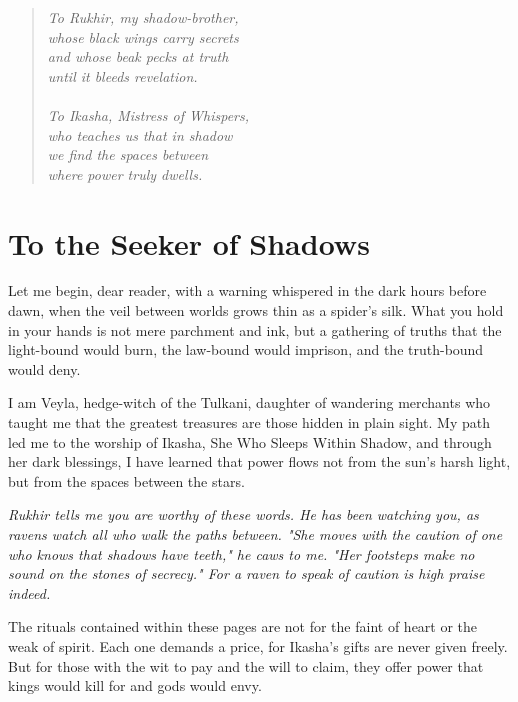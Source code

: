 \documentclass[12pt,twoside]{book}
\newcommand{\shadow}[1]{\textit{#1}}
\begin{document}
\newpage
\thispagestyle{empty}
\vspace*{8cm}
\begin{center}
\begin{verse}
\textit{To Rukhir, my shadow-brother,}\\
\textit{whose black wings carry secrets} \\
\textit{and whose beak pecks at truth} \\
\textit{until it bleeds revelation.} \\
\ \\
\textit{To Ikasha, Mistress of Whispers,}\\
\textit{who teaches us that in shadow} \\
\textit{we find the spaces between} \\
\textit{where power truly dwells.}
\end{verse}
\end{center}

\tableofcontents

\mainmatter

\chapter{To the Seeker of Shadows}

\lettrine[lines=3]{L}{}et me begin, dear reader, with a warning whispered in the dark hours before dawn, when the veil between worlds grows thin as a spider's silk. What you hold in your hands is not mere parchment and ink, but a gathering of truths that the light-bound would burn, the law-bound would imprison, and the truth-bound would deny.

I am Veyla, hedge-witch of the Tulkani, daughter of wandering merchants who taught me that the greatest treasures are those hidden in plain sight. My path led me to the worship of Ikasha, She Who Sleeps Within Shadow, and through her dark blessings, I have learned that power flows not from the sun's harsh light, but from the spaces between the stars.

\shadow{Rukhir tells me you are worthy of these words. He has been watching you, as ravens watch all who walk the paths between. "She moves with the caution of one who knows that shadows have teeth," he caws to me. "Her footsteps make no sound on the stones of secrecy." For a raven to speak of caution is high praise indeed.}

The rituals contained within these pages are not for the faint of heart or the weak of spirit. Each one demands a price, for Ikasha's gifts are never given freely. But for those with the wit to pay and the will to claim, they offer power that kings would kill for and gods would envy.
\end{document}
